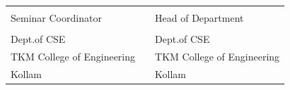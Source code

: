 	
	\begin{singlespace}
		\vspace*{3cm}
		\begin{table}[h!]
			\centering
			\begin{tabular}{p{7cm} p{4 cm} p{7cm}} 
				\textbf{\semcordinatorA} && \textbf{\hod} \\
				Seminar Coordinator &&  Head of Department\\
				\semcordinatorAdes & & \hoddes\\ 
				Dept.of CSE && Dept.of CSE\\ 
				TKM College of Engineering & & TKM College of Engineering\\
				Kollam && Kollam\\
			\end{tabular}
			
		\end{table}
		
		\vspace*{1.3cm}
		
			
			
	\end{singlespace}
	
	\thispagestyle{empty}




